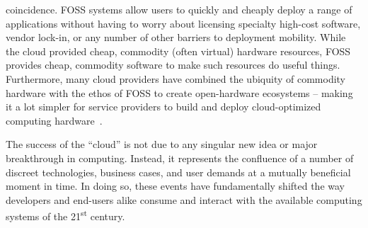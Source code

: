 \begin{packed_desc}
  coincidence. FOSS systems allow users to quickly and cheaply deploy
  a range of applications without having to worry about licensing
  specialty high-cost software, vendor lock-in, or any number of other
  barriers to deployment mobility. While the cloud provided cheap,
  commodity (often virtual) hardware resources, FOSS provides cheap,
  commodity software to make such resources do useful
  things. Furthermore, many cloud providers have combined the ubiquity
  of commodity hardware with the ethos of FOSS to create open-hardware
  ecosystems -- making it a lot simpler for service providers to build
  and deploy cloud-optimized computing hardware~\cite{opencompute}.
\end{packed_desc}

The success of the ``cloud'' is not due to any singular new idea or
major breakthrough in computing. Instead, it represents the confluence
of a number of discreet technologies, business cases, and user demands
at a mutually beneficial moment in time. In doing so, these events
have fundamentally shifted the way developers and end-users alike
consume and interact with the available computing systems of the
21\textsuperscript{st} century.

